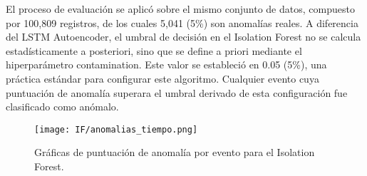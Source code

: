 El proceso de evaluación se aplicó sobre el mismo conjunto de datos, compuesto por 100,809 registros, de los cuales 5,041 (5\%) son anomalías reales. A diferencia del LSTM Autoencoder, el umbral de decisión en el Isolation Forest no se calcula estadísticamente a posteriori, sino que se define a priori mediante el hiperparámetro contamination. Este valor se estableció en 0.05 (5\%), una práctica estándar para configurar este algoritmo. Cualquier evento cuya puntuación de anomalía superara el umbral derivado de esta configuración fue clasificado como anómalo.

\begin{figure}[ht!]
      \centering
      \texttt{[image: IF/anomalias\_tiempo.png]}
      \caption{Gráficas de puntuación de anomalía por evento para el Isolation Forest.}
      \label{fig:anomalias_if}
\end{figure}


